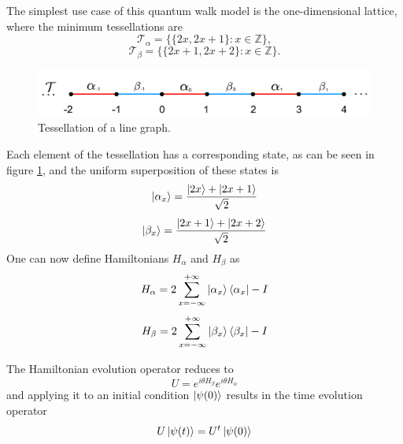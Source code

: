 \documentclass[../../dissertation.tex]{subfiles}
\begin{document}
The simplest use case of this quantum walk model is the one-dimensional
lattice, where the minimum tessellations are
\begin{equation}
	\mathscr{T}_{\alpha}= \{\{2x,2x+1\}\colon x \in \mathbb{Z}\},
\end{equation}
\begin{equation}
	\mathscr{T}_{\beta}= \{\{2x+1,2x+2\}\colon x \in \mathbb{Z}\}.
\end{equation}
\begin{figure}[!h]
	\centering
	\includegraphics[scale=0.40]{img/StagQuantumWalk/tesselation.png}
	\caption{Tessellation of a line graph.} 
	\label{fig:stagQWTesselation}
\end{figure}
Each element of the tessellation has a corresponding state, as can be seen in
figure \ref{fig:stagQWTesselation}, and the uniform superposition of these
states is
\begin{equation}
	\ket{\alpha_x} = \frac{\ket{2x} + \ket{2x+1}}{\sqrt{2}}
\end{equation}
\begin{equation}
	\ket{\beta_x} = \frac{\ket{2x+1}+\ket{2x+2}}{\sqrt{2}}
\end{equation}
One can now define Hamiltonians $H_\alpha$ and $H_\beta$ as 
\begin{equation}
	H_\alpha = 2\sum_{x=-\infty}^{+\infty}\ket{\alpha_{x}}\bra{\alpha_x} - I
	\label{eq:stagSimulHalpha}
\end{equation}
\begin{equation}
	H_\beta = 2\sum_{x=-\infty}^{+\infty}\ket{\beta_{x}}\bra{\beta_x} - I
	\label{eq:stagSimulHbeta}
\end{equation}\par
The Hamiltonian evolution operator reduces to
\begin{equation}
	U = e^{i\theta H_\beta}e^{i\theta H_\alpha}
	\label{eq:stagSimulUniOp}
\end{equation}
and applying it to an initial condition $\ket{\psi(0)}$ results in the time
evolution operator
\begin{equation}
	U\ket{\psi(t)} = U^t\ket{\psi(0)}
\end{equation}\par
\end{document}
